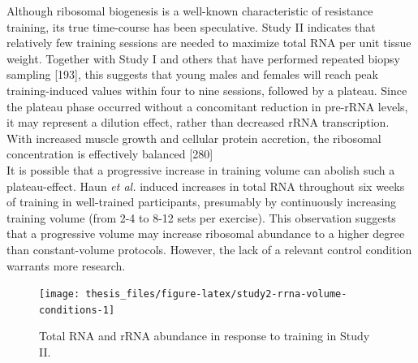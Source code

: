 \documentclass[twoside,10pt]{gihclass} %
\begin{document}
Although ribosomal biogenesis is a well-known characteristic of resistance training, its true time-course has been speculative.
Study II indicates that relatively few training sessions are needed to maximize total RNA per unit tissue weight.
Together with Study I and others that have performed repeated biopsy sampling {[}193{]}, this suggests that young males and females will reach peak training-induced values within four to nine sessions, followed by a plateau.
Since the plateau phase occurred without a concomitant reduction in pre-rRNA levels, it may represent a dilution effect, rather than decreased rRNA transcription. With increased muscle growth and cellular protein accretion, the ribosomal concentration is effectively balanced
{[}280{]}\\
It is possible that a progressive increase in training volume can abolish such a plateau-effect. Haun \emph{et al.} induced increases in total RNA throughout six weeks of training in well-trained participants, presumably by continuously increasing training volume (from 2-4 to 8-12 sets per exercise). This observation suggests that a progressive volume may increase ribosomal abundance to a higher degree than constant-volume protocols.
However, the lack of a relevant control condition warrants more research.
\begin{figure}

{\centering \texttt{[image: thesis\_files/figure-latex/study2-rrna-volume-conditions-1]} 

}

\caption[Total RNA (a) and rRNA (b) abundance in response to resistance training in variable- and constant-volume training conditions. Asterisk indicate robust difference between volume conditions.]{Total RNA and rRNA abundance in response to training in Study II.}\label{fig:study2-rrna-volume-conditions}
\end{figure}
\end{document}
